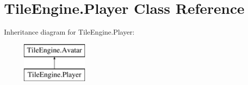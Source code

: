 \hypertarget{class_tile_engine_1_1_player}{\section{Tile\-Engine.\-Player Class Reference}
\label{de/dfa/class_tile_engine_1_1_player}
}
Inheritance diagram for Tile\-Engine.\-Player\-:\begin{figure}[H]
\begin{center}
\leavevmode
\includegraphics[height=2.000000cm]{de/dfa/class_tile_engine_1_1_player}
\end{center}
\end{figure}
